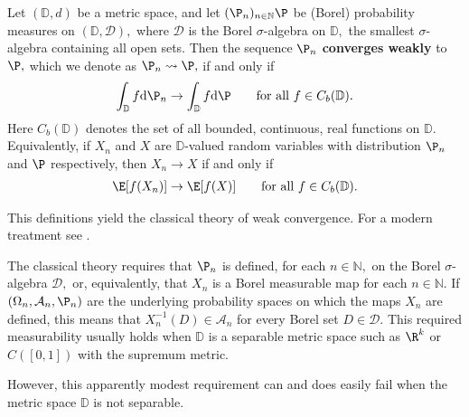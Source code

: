 
Let 
$
(
\mathbb{D}
,
d
)
$
be a metric space, and let 
$
(\P_n)_{n\in \mathbb{N}}
  \P
$
be (Borel) probability measures
on
$
(
\mathbb{D}
,
\mathcal{D}
)
,
$
where 
$\mathcal{D}$
is the Borel $\sigma$-algebra on $\mathbb{D},$
the smallest $\sigma$-algebra
containing all open sets.
Then the sequence 
$\P_n$
\textbf{converges weakly}
to 
$\P,$
which we denote as $\P_n \rightsquigarrow \P,$
if and only if 
\begin{gather}
  \int_\mathbb{D}
  f
  \text{d}
  \P_n
  \to
  \int_\mathbb{D}
  f
  \text{d}
  \P
  \qquad
  \text{for all}
  \ 
  f
  \in
  C_b(\mathbb{D})
  .
\end{gather}
Here 
$
  C_b(\mathbb{D})
$
denotes the set of all bounded, continuous, real functions on $\mathbb{D}.$
Equivalently, if 
$X_n$ and $X$
are 
$\mathbb{D}$-valued
random variables with distribution 
$\P_n$ and $\P$
respectively, then 
$X_n \to X$
if and only if 
\begin{gather}
  \E[f(X_n)]
  \to
  \E[f(X)]
  \qquad
  \text{for all}
  \ 
  f
  \in
  C_b(\mathbb{D})
  .
\end{gather}

This definitions yield the classical theory of weak convergence.
For a modern treatment see \cite{Klenke2020}.

The classical theory requires that 
$\P_n$
is defined, for each $n\in \mathbb{N},$
on the Borel $\sigma$-algebra $\mathcal{D},$
or, equivalently, that $X_n$ is a Borel measurable map for each $n\in \mathbb{N}.$
If 
$
(
\Omega_n,
\mathcal{A}_n,
\P_n
)
$
are the underlying probability spaces on which the maps 
$X_n$
are defined, this means that
$X_n^{-1}(D)\in \mathcal{A}_n$
for every Borel set $D \in \mathcal{D}.$
This required measurability usually holds when $\mathbb{D}$
is a separable metric space such as $\R^k$
or $C([0,1])$ with the supremum metric.

However, this apparently modest requirement can and does easily fail when the metric space $\mathbb{D}$ is not separable.

